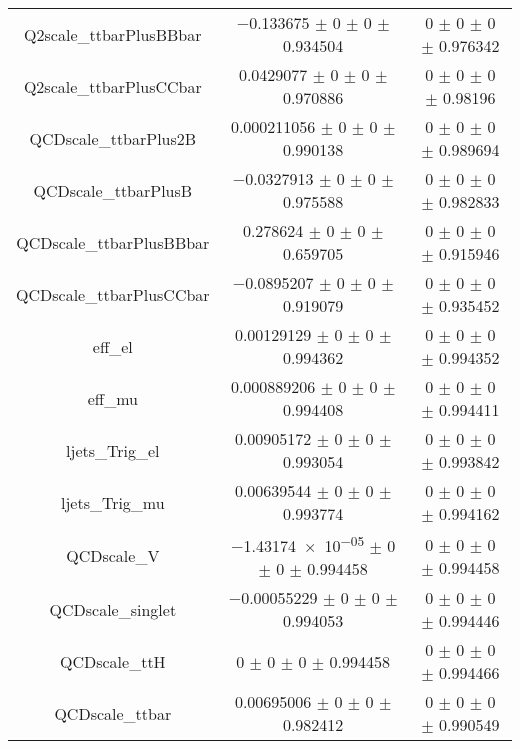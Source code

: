 \begin{table}
\begin{tabular}{ccc}
Q2scale\_ttbarPlusBBbar & \num{-0.133675} $\pm$ \num{0} $\pm$ \num{0} $\pm$ \num{0.934504} & \num{0} $\pm$ \num{0} $\pm$ \num{0} $\pm$ \num{0.976342}\\
Q2scale\_ttbarPlusCCbar & \num{0.0429077} $\pm$ \num{0} $\pm$ \num{0} $\pm$ \num{0.970886} & \num{0} $\pm$ \num{0} $\pm$ \num{0} $\pm$ \num{0.98196}\\
QCDscale\_ttbarPlus2B & \num{0.000211056} $\pm$ \num{0} $\pm$ \num{0} $\pm$ \num{0.990138} & \num{0} $\pm$ \num{0} $\pm$ \num{0} $\pm$ \num{0.989694}\\
QCDscale\_ttbarPlusB & \num{-0.0327913} $\pm$ \num{0} $\pm$ \num{0} $\pm$ \num{0.975588} & \num{0} $\pm$ \num{0} $\pm$ \num{0} $\pm$ \num{0.982833}\\
QCDscale\_ttbarPlusBBbar & \num{0.278624} $\pm$ \num{0} $\pm$ \num{0} $\pm$ \num{0.659705} & \num{0} $\pm$ \num{0} $\pm$ \num{0} $\pm$ \num{0.915946}\\
QCDscale\_ttbarPlusCCbar & \num{-0.0895207} $\pm$ \num{0} $\pm$ \num{0} $\pm$ \num{0.919079} & \num{0} $\pm$ \num{0} $\pm$ \num{0} $\pm$ \num{0.935452}\\
eff\_el & \num{0.00129129} $\pm$ \num{0} $\pm$ \num{0} $\pm$ \num{0.994362} & \num{0} $\pm$ \num{0} $\pm$ \num{0} $\pm$ \num{0.994352}\\
eff\_mu & \num{0.000889206} $\pm$ \num{0} $\pm$ \num{0} $\pm$ \num{0.994408} & \num{0} $\pm$ \num{0} $\pm$ \num{0} $\pm$ \num{0.994411}\\
ljets\_Trig\_el & \num{0.00905172} $\pm$ \num{0} $\pm$ \num{0} $\pm$ \num{0.993054} & \num{0} $\pm$ \num{0} $\pm$ \num{0} $\pm$ \num{0.993842}\\
ljets\_Trig\_mu & \num{0.00639544} $\pm$ \num{0} $\pm$ \num{0} $\pm$ \num{0.993774} & \num{0} $\pm$ \num{0} $\pm$ \num{0} $\pm$ \num{0.994162}\\
QCDscale\_V & \num{-1.43174e-05} $\pm$ \num{0} $\pm$ \num{0} $\pm$ \num{0.994458} & \num{0} $\pm$ \num{0} $\pm$ \num{0} $\pm$ \num{0.994458}\\
QCDscale\_singlet & \num{-0.00055229} $\pm$ \num{0} $\pm$ \num{0} $\pm$ \num{0.994053} & \num{0} $\pm$ \num{0} $\pm$ \num{0} $\pm$ \num{0.994446}\\
QCDscale\_ttH & \num{0} $\pm$ \num{0} $\pm$ \num{0} $\pm$ \num{0.994458} & \num{0} $\pm$ \num{0} $\pm$ \num{0} $\pm$ \num{0.994466}\\
QCDscale\_ttbar & \num{0.00695006} $\pm$ \num{0} $\pm$ \num{0} $\pm$ \num{0.982412} & \num{0} $\pm$ \num{0} $\pm$ \num{0} $\pm$ \num{0.990549}\\

\end{tabular}
\end{table}
